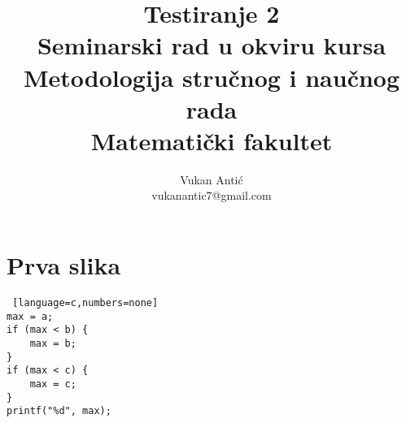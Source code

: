 \documentclass[a4paper]{article}
\begin{document}
\title{Testiranje 2\\ \small{Seminarski rad u okviru kursa\\Metodologija stručnog i naučnog rada\\ Matematički fakultet}}

\author{Vukan Antić\\ vukanantic7@gmail.com}


\maketitle

\tableofcontents




\newcommand{\Cross}{$\mathbin{\tikz [x=1.4ex,y=1.4ex,line width=.2ex, red] \draw (0,0) -- (1,1) (0,1) -- (1,0);}$}

\newcommand{\Checkmark}{$\color{green}\checkmark$}




\usetikzlibrary{er,calc,shapes.arrows,decorations.pathreplacing,shadows}

\newpage

\section{Prva slika}
\label{sec:prva_slika}

\begin{lstlisting} [language=c,numbers=none]
max = a;
if (max < b) {
    max = b;
}
if (max < c) {
    max = c;
}
printf("%d", max);

\end{lstlisting}
\end{document}
